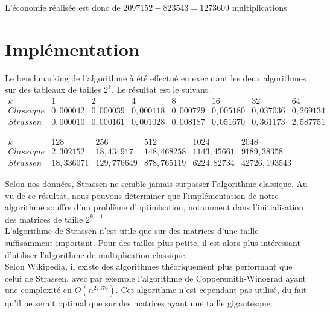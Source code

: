 \documentclass[a4paper,10pt,margin=2in]{report}
\begin{document}
L'économie réalisée est donc de $2 097 152 - 823543 = 1 273 609$ multiplications

\chapter{Implémentation}
Le benchmarking de l'algorithme à été effectué en executant les deux algorithmes sur des tableaux de tailles $2^k$. Le résultat est le suivant.\\

$\begin{array}{ *{13}{c} }
k & 1 & 2 & 4 & 8 & 16 & 32 & 64  \\
Classique & 0,000042 & 0,000039 & 0,000118 & 0,000729 & 0,005180 & 0,037036 & 0,269134  \\
Strassen & 0,000010 & 0,000161 & 0,001028 & 0,008187 & 0,051670 & 0,361173 & 2,587751
\end{array}$

\bigskip
$\begin{array}{ *{13}{c} }
k & 128 & 256 & 512 & 1024 & 2048 \\
Classique& 2,302152 & 18,434917 & 148,468258 & 1143,45661 & 9189,38358 \\
Strassen & 18,336071 & 129,776649 & 878,765119 & 6224,82734 & 42726,193543
\end{array}$

\bigskip
Selon nos données, Strassen ne semble jamais surpasser l'algorithme classique. Au vu de ce résultat, nous pouvons déterminer que l'implémentation de notre algorithme souffre d'un problème d'optimisation, notamment dans l'initialisation des matrices de taille $2^{k-1}$\\

L'algorithme de Strassen n'est utile que sur des matrices d'une taille suffisamment important. Pour des tailles plus petite, il est alors plus intéressant d'utiliser l'algorithme de multiplication classique.\\

Selon Wikipedia, il existe des algorithmes théoriquement plus performant que celui de Strassen, avec par exemple l'algorithme de Coppersmith-Winograd ayant une complexité en $O(n^{2,376})$. Cet algorithme n'est cependant pas utilisé, du fait qu'il ne serait optimal que sur des matrices ayant une taille gigantesque.
\end{document}
